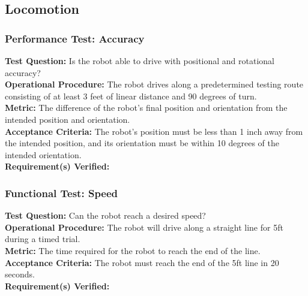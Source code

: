
\subsection{Locomotion}
\label{sec:verification_locomotion}

\subsubsection{Performance Test: Accuracy}
\label{test:locomotion_pt_accuracy}
\textbf{Test Question:} Is the robot able to drive with positional and rotational accuracy?\\
\textbf{Operational Procedure:} The robot drives along a predetermined testing route consisting of at least 3 feet of linear distance and 90 degrees of turn.\\
\textbf{Metric:} The difference of the robot's final position and orientation from the intended position and orientation. \\
\textbf{Acceptance Criteria:} The robot's position must be less than 1 inch away from the intended position, and its orientation must be within 10 degrees of the intended orientation.\\
\textbf{Requirement(s) Verified:} 

\subsubsection{Functional Test: Speed}
\label{test:locomotion_ft_speed}
\textbf{Test Question:} Can the robot reach a desired speed? \\
\textbf{Operational Procedure:} The robot will drive along a straight line for 5ft during a timed trial.\\
\textbf{Metric:} The time required for the robot to reach the end of the line.\\
\textbf{Acceptance Criteria:} The robot must reach the end of the 5ft line in 20 seconds. \\
\textbf{Requirement(s) Verified:} 

